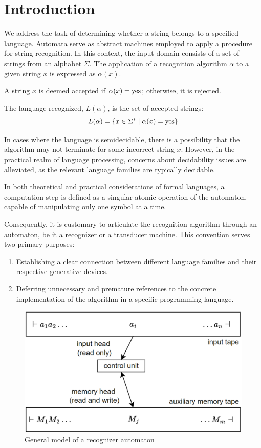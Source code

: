 \section{Introduction}

We address the task of determining whether a string belongs to a specified language. 
Automata serve as abstract machines employed to apply a procedure for string recognition.
In this context, the input domain consists of a set of strings from an alphabet $\Sigma$.
The application of a recognition algorithm $\alpha$ to a given string $x$ is expressed as $\alpha(x)$.
\begin{definition}
    A string $x$ is deemed accepted if $\alpha(x) = \textnormal{yes}$; otherwise, it is rejected.
\end{definition}
\begin{definition}
    The language recognized, $L(\alpha)$, is the set of accepted strings:
    \[L(\alpha)=\{x \in \Sigma^{\ast}\mid \alpha(x)=\textnormal{yes}\}\]
\end{definition}
In cases where the language is semidecidable, there is a possibility that the algorithm may not terminate for some incorrect string $x$.
However, in the practical realm of language processing, concerns about decidability issues are alleviated, as the relevant language families are typically decidable.
\begin{definition}
    In both theoretical and practical considerations of formal languages, a computation step is defined as a singular atomic operation of the automaton, capable of manipulating only one symbol at a time. 
\end{definition}
Consequently, it is customary to articulate the recognition algorithm through an automaton, be it a recognizer or a transducer machine. 
This convention serves two primary purposes:
\begin{enumerate}
    \item Establishing a clear connection between different language families and their respective generative devices.
    \item Deferring unnecessary and premature references to the concrete implementation of the algorithm in a specific programming language.
\end{enumerate}
\begin{figure}[H]
    \centering
    \includegraphics[width=0.5\linewidth]{images/fsa.png}
    \caption{General model of a recognizer automaton}
\end{figure}

